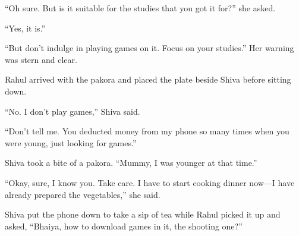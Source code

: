 ``Oh sure. But is it suitable for the studies that you got it for?'' she asked.

``Yes, it is.''

``But don't indulge in playing games on it. Focus on your studies.'' Her warning was stern and clear.

Rahul arrived with the pakora and placed the plate beside Shiva before sitting down.

``No. I don't play games,'' Shiva said.

``Don't tell me. You deducted money from my phone so many times when you were young, just looking for games.''

Shiva took a bite of a pakora. ``Mummy, I was younger at that time.''

``Okay, sure, I know you. Take care. I have to start cooking dinner now—I have already prepared the vegetables,'' she said.

Shiva put the phone down to take a sip of tea while Rahul picked it up and asked, ``Bhaiya, how to download games in it, the shooting one?''
